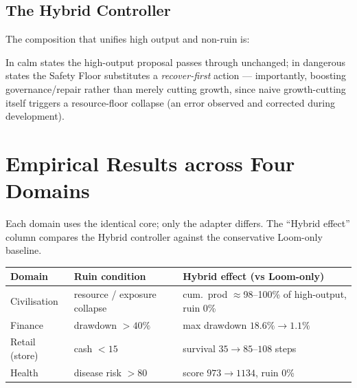 \section{The Hybrid Controller}

The composition that unifies high output and non-ruin is:

\begin{center}
\end{center}

In calm states the high-output proposal passes through unchanged; in
dangerous states the Safety Floor substitutes a \emph{recover-first}
action --- importantly, boosting governance/repair rather than merely
cutting growth, since naive growth-cutting itself triggers a
resource-floor collapse (an error observed and corrected during
development).

\chapter{Empirical Results across Four Domains}
\label{ch:four_domains}

Each domain uses the identical core; only the adapter differs. The
``Hybrid effect'' column compares the Hybrid controller against the
conservative Loom-only baseline.

\begin{center}
\begin{tabular}{lll}
\toprule
Domain & Ruin condition & Hybrid effect (vs Loom-only) \\
\midrule
Civilisation   & resource / exposure collapse & cum.\ prod $\approx$98--100\% of high-output, ruin 0\% \\
Finance        & drawdown $>40\%$             & max drawdown $18.6\%\!\to\!1.1\%$ \\
Retail (store) & cash $<15$                   & survival $35\!\to\!85$--$108$ steps \\
Health         & disease risk $>80$           & score $973\!\to\!1134$, ruin 0\% \\
\bottomrule
\end{tabular}
\end{center}

